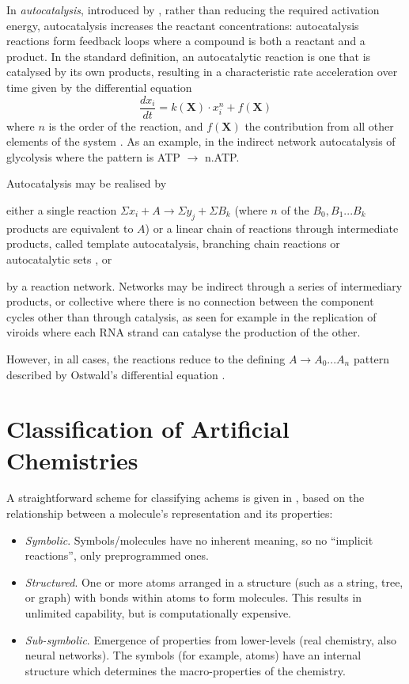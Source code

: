 In \emph{autocatalysis}, introduced by \textcite{Ostwald1890}, rather than reducing the required activation
energy, autocatalysis increases the reactant concentrations: autocatalysis reactions form feedback loops where a compound is both a
reactant and a product. In the standard definition, an autocatalytic reaction is one that is catalysed by its own products, resulting in a
characteristic rate acceleration over time given by the differential equation \[\frac{dx_i}{dt} = k(\mathbf{X}) \cdot x^n_i + f(\mathbf{X})\] where $n$ is the order of the reaction, and $f(\mathbf{X})$ the contribution from all other elements of the system \parencite{Plasson2010}. As an example, in the indirect network autocatalysis of glycolysis where the pattern is ATP \(\rightarrow\) n.ATP.

Autocatalysis may be realised by \begin{inparaenum}
	\item either a single reaction \eg$\Sigma x_i + A\rightarrow \Sigma y_j + \Sigma B_k$ (where $n$ of the ${B_0, B_1...B_k}$ products are equivalent to $A$) or a linear chain of reactions through intermediate products, called template autocatalysis, branching chain reactions or autocatalytic sets \parencite{King1978}, or
	\item by a reaction network. Networks may be indirect through a series of intermediary products, or collective where there is no connection between the component cycles other than through catalysis, as seen for example in the replication of viroids where each RNA strand can catalyse the production of the other.
\end{inparaenum}

However, in all cases, the reactions reduce to the defining $A \rightarrow A_0...A_n$ pattern described by Ostwald's differential equation \parencite{Plasson2010}.

\section{Classification of Artificial Chemistries}\label{classification-of-artificial-chemistries}

A straightforward scheme for classifying \glspl{achem} is given in \textcite{Faulconbridge2011}, based on the relationship between a molecule's representation and its properties:

\begin{itemize}
	\item \emph{Symbolic}. Symbols/molecules have no inherent meaning, so no ``implicit reactions'', only preprogrammed ones.	
	\item \emph{Structured}. One or more atoms arranged in a structure (such as a string, tree, or graph) with bonds within atoms to form molecules. This results in unlimited capability, but is computationally expensive.	
	\item \emph{Sub-symbolic}. Emergence of properties from lower-levels (\eg real chemistry, also neural networks). The symbols (for example, atoms) have an internal structure which determines the macro-properties of the chemistry.
\end{itemize}

